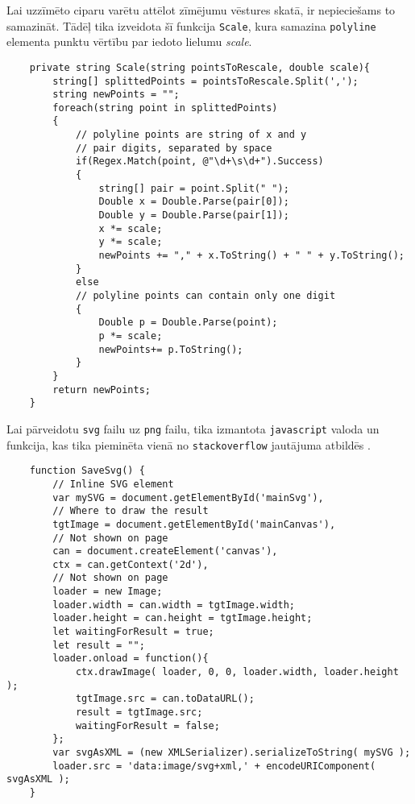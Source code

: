 \par Lai uzzīmēto ciparu varētu attēlot zīmējumu vēstures skatā, ir nepieciešams to samazināt. Tādēļ tika izveidota šī funkcija \texttt{Scale}, kura samazina \texttt{polyline} elementa punktu vērtību par iedoto lielumu \textit{scale}.
{
\begin{verbatim}
    private string Scale(string pointsToRescale, double scale){
        string[] splittedPoints = pointsToRescale.Split(',');
        string newPoints = "";
        foreach(string point in splittedPoints)
        {
            // polyline points are string of x and y
            // pair digits, separated by space
            if(Regex.Match(point, @"\d+\s\d+").Success)
            {
                string[] pair = point.Split(" ");
                Double x = Double.Parse(pair[0]);
                Double y = Double.Parse(pair[1]);
                x *= scale;
                y *= scale;
                newPoints += "," + x.ToString() + " " + y.ToString();
            }
            else
            // polyline points can contain only one digit
            {
                Double p = Double.Parse(point);
                p *= scale;
                newPoints+= p.ToString();
            }
        }
        return newPoints;
    }
\end{verbatim}
}

\par Lai pārveidotu \texttt{svg} failu uz \texttt{png} failu, tika izmantota \texttt{javascript} valoda un funkcija, kas tika pieminēta vienā no \texttt{stackoverflow} jautājuma atbildēs \cite{stackoverflow_answer}.

{
\begin{verbatim}
    function SaveSvg() {
        // Inline SVG element
        var mySVG = document.getElementById('mainSvg'),
        // Where to draw the result
        tgtImage = document.getElementById('mainCanvas'),
        // Not shown on page
        can = document.createElement('canvas'),
        ctx = can.getContext('2d'),
        // Not shown on page
        loader = new Image;
        loader.width = can.width = tgtImage.width;
        loader.height = can.height = tgtImage.height;
        let waitingForResult = true;
        let result = "";
        loader.onload = function(){
            ctx.drawImage( loader, 0, 0, loader.width, loader.height );
            tgtImage.src = can.toDataURL();
            result = tgtImage.src;
            waitingForResult = false;
        };
        var svgAsXML = (new XMLSerializer).serializeToString( mySVG );
        loader.src = 'data:image/svg+xml,' + encodeURIComponent( svgAsXML );
    }
\end{verbatim}
}

